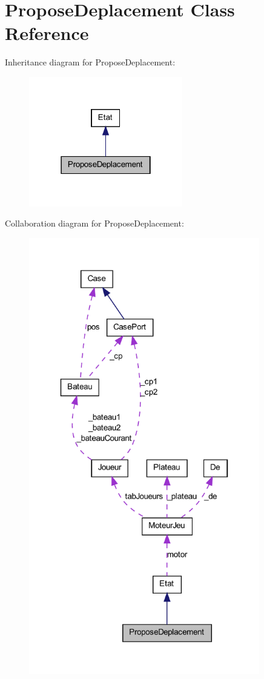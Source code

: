 \hypertarget{class_propose_deplacement}{
\section{ProposeDeplacement Class Reference}
\label{class_propose_deplacement}
}


Inheritance diagram for ProposeDeplacement:
\nopagebreak
\begin{figure}[H]
\begin{center}
\leavevmode
\includegraphics[width=190pt]{class_propose_deplacement__inherit__graph}
\end{center}
\end{figure}


Collaboration diagram for ProposeDeplacement:
\nopagebreak
\begin{figure}[H]
\begin{center}
\leavevmode
\includegraphics[width=285pt]{class_propose_deplacement__coll__graph}
\end{center}
\end{figure}
